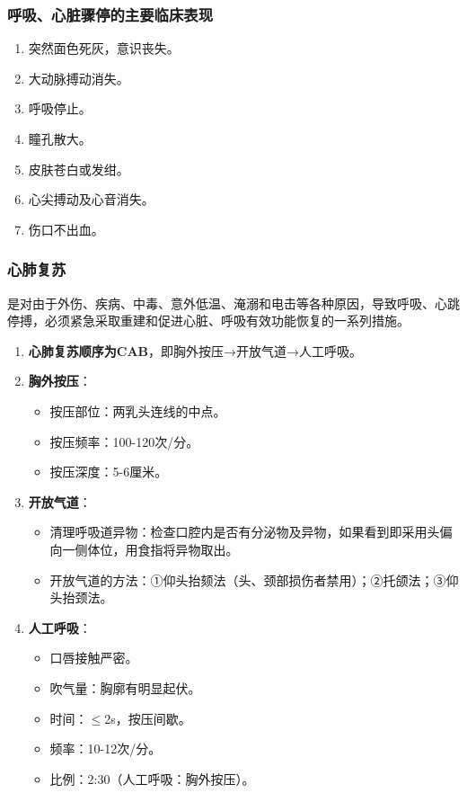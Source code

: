 \documentclass[11pt, a4paper]{ctexart}
\begin{document}
\subsubsection{呼吸、心脏骤停的主要临床表现}
\begin{enumerate}
	\item 突然面色死灰，意识丧失。
	\item 大动脉搏动消失。
	\item 呼吸停止。
	\item 瞳孔散大。
	\item 皮肤苍白或发绀。
	\item 心尖搏动及心音消失。
	\item 伤口不出血。
\end{enumerate}

\subsubsection{心肺复苏}
是对由于外伤、疾病、中毒、意外低温、淹溺和电击等各种原因，导致呼吸、心跳停搏，必须紧急采取重建和促进心脏、呼吸有效功能恢复的一系列措施。

\begin{enumerate}
	\item \textbf{心肺复苏顺序为CAB}，即胸外按压→开放气道→人工呼吸。
	\item \textbf{胸外按压}：
	      \begin{itemize}
		      \item 按压部位：两乳头连线的中点。
		      \item 按压频率：100-120次/分。
		      \item 按压深度：5-6厘米。
	      \end{itemize}
	\item \textbf{开放气道}：
	      \begin{itemize}
		      \item 清理呼吸道异物：检查口腔内是否有分泌物及异物，如果看到即采用头偏向一侧体位，用食指将异物取出。
		      \item 开放气道的方法：①仰头抬颏法（头、颈部损伤者禁用）；②托颌法；③仰头抬颈法。
	      \end{itemize}
	\item \textbf{人工呼吸}：
	      \begin{itemize}
		      \item 口唇接触严密。
		      \item 吹气量：胸廓有明显起伏。
		      \item 时间：$\leq$2s，按压间歇。
		      \item 频率：10-12次/分。
		      \item 比例：2:30（人工呼吸：胸外按压）。
	      \end{itemize}
\end{enumerate}
\end{document}
